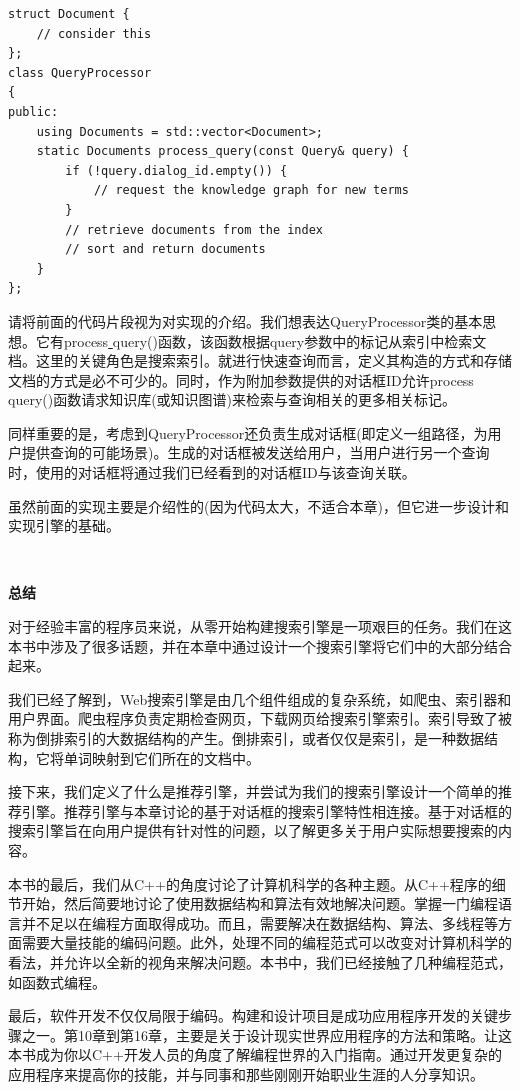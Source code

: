\begin{lstlisting}[caption={}]
struct Document {
	// consider this
};
class QueryProcessor
{
public:
	using Documents = std::vector<Document>;
	static Documents process_query(const Query& query) {
		if (!query.dialog_id.empty()) {
			// request the knowledge graph for new terms
		}
		// retrieve documents from the index
		// sort and return documents
	}
};
\end{lstlisting}

请将前面的代码片段视为对实现的介绍。我们想表达QueryProcessor类的基本思想。它有process\underline{ }query()函数，该函数根据query参数中的标记从索引中检索文档。这里的关键角色是搜索索引。就进行快速查询而言，定义其构造的方式和存储文档的方式是必不可少的。同时，作为附加参数提供的对话框ID允许process\underline{ }query()函数请求知识库(或知识图谱)来检索与查询相关的更多相关标记。 \par
同样重要的是，考虑到QueryProcessor还负责生成对话框(即定义一组路径，为用户提供查询的可能场景)。生成的对话框被发送给用户，当用户进行另一个查询时，使用的对话框将通过我们已经看到的对话框ID与该查询关联。 \par
虽然前面的实现主要是介绍性的(因为代码太大，不适合本章)，但它进一步设计和实现引擎的基础。 \par

\noindent\textbf{}\ \par
\textbf{总结} \ \par
对于经验丰富的程序员来说，从零开始构建搜索引擎是一项艰巨的任务。我们在这本书中涉及了很多话题，并在本章中通过设计一个搜索引擎将它们中的大部分结合起来。 \par
我们已经了解到，Web搜索引擎是由几个组件组成的复杂系统，如爬虫、索引器和用户界面。爬虫程序负责定期检查网页，下载网页给搜索引擎索引。索引导致了被称为倒排索引的大数据结构的产生。倒排索引，或者仅仅是索引，是一种数据结构，它将单词映射到它们所在的文档中。 \par
接下来，我们定义了什么是推荐引擎，并尝试为我们的搜索引擎设计一个简单的推荐引擎。推荐引擎与本章讨论的基于对话框的搜索引擎特性相连接。基于对话框的搜索引擎旨在向用户提供有针对性的问题，以了解更多关于用户实际想要搜索的内容。 \par
本书的最后，我们从C++的角度讨论了计算机科学的各种主题。从C++程序的细节开始，然后简要地讨论了使用数据结构和算法有效地解决问题。掌握一门编程语言并不足以在编程方面取得成功。而且，需要解决在数据结构、算法、多线程等方面需要大量技能的编码问题。此外，处理不同的编程范式可以改变对计算机科学的看法，并允许以全新的视角来解决问题。本书中，我们已经接触了几种编程范式，如函数式编程。 \par
最后，软件开发不仅仅局限于编码。构建和设计项目是成功应用程序开发的关键步骤之一。第10章到第16章，主要是关于设计现实世界应用程序的方法和策略。让这本书成为你以C++开发人员的角度了解编程世界的入门指南。通过开发更复杂的应用程序来提高你的技能，并与同事和那些刚刚开始职业生涯的人分享知识。 \par

